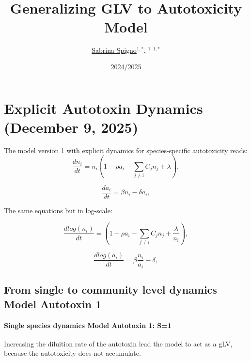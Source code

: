 \documentclass[11pt,a4paper,fleqn]{scrartcl}
\begin{document}
\title{Generalizing GLV to Autotoxicity Model}
\author{
	\small{%
		\href{https://orcid.org/}{Sabrina Spigno}\(^{1, *}\),
		\href{https://orcid.org/}{}\(^1\)
		\href{}{}\(^{1, *}\)
	}
}
\date{2024/2025}
\maketitle  

\section{Explicit Autotoxin Dynamics (December 9, 2025)}
The model version 1 with explicit dynamics for species-specific autotoxicity reads:
\begin{equation}
\frac{dn_i}{dt} = n_i \left(1 - \rho a_i - \sum_{j \neq i} C_{j} n_j + \lambda \right), \label{eq:model1}
\end{equation}

\begin{equation}
\frac{da_i}{dt} = \beta n_i - \delta a_i, \label{eq:model2}
\end{equation}

The same equations but in log-scale:

\begin{equation}
\frac{dlog(n_i)}{dt} =  \left(1 - \rho a_i - \sum_{j \neq i} C_{j} n_j + \frac{\lambda}{n_i} \right), \label{eq:modellog1}
\end{equation}

\begin{equation}
\frac{dlog(a_i)}{dt} = \beta\frac{n_i}{a_i} - \delta , \label{eq:modellog2}
\end{equation}
\clearpage

\subsection{From single to community level dynamics Model Autotoxin 1}

\paragraph{Single species dynamics Model Autotoxin 1: S=1}
Increasing the diluition rate of the autotoxin lead the model to act as a gLV, because the autotoxicity does not accumulate.
\end{document}
